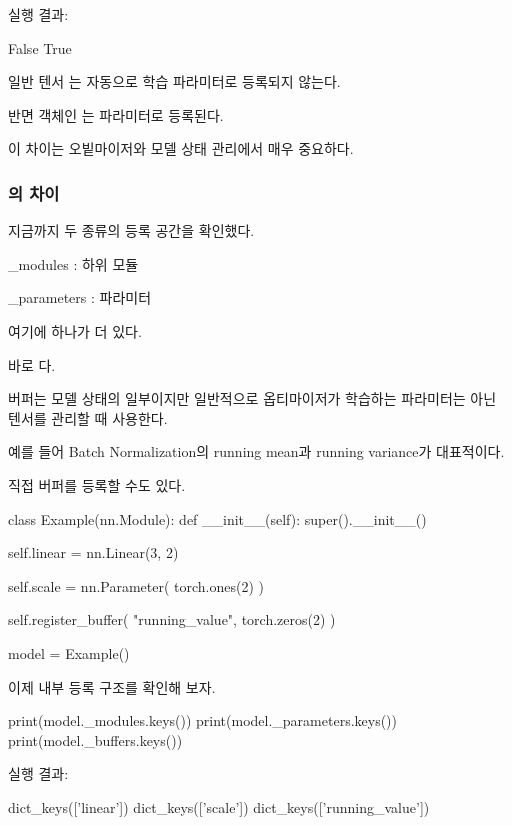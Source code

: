 실행 결과:

\begin{dhkzsh}
False
True
\end{dhkzsh}

일반 텐서 는 자동으로 학습 파라미터로 등록되지 않는다.

반면  객체인 는 파라미터로 등록된다.

이 차이는 오빝마이저와 모델 상태 관리에서 매우 중요하다.

\subsubsection{의 차이}

지금까지 두 종류의 등록 공간을 확인했다.

\begin{dhksmry}
    _modules : 하위 모듈

    _parameters : 파라미터
\end{dhksmry}

여기에 하나가 더 있다.

바로 다.

버퍼는 모델 상태의 일부이지만 일반적으로 옵티마이저가 학습하는 파라미터는 아닌 텐서를 관리할 때 사용한다.

예를 들어 Batch Normalization의 running mean과 running variance가 대표적이다.

직접 버퍼를 등록할 수도 있다.

\begin{dhkcode}
class Example(nn.Module):
    def __init__(self):
        super().__init__()

        self.linear = nn.Linear(3, 2)

        self.scale = nn.Parameter(
            torch.ones(2)
        )

        self.register_buffer(
            "running_value",
            torch.zeros(2)
        )

model = Example()
\end{dhkcode}

이제 내부 등록 구조를 확인해 보자.

\begin{dhkcode}
print(model._modules.keys())
print(model._parameters.keys())
print(model._buffers.keys())
\end{dhkcode}

실행 결과:

\begin{dhkzsh}
dict_keys(['linear'])
dict_keys(['scale'])
dict_keys(['running_value'])
\end{dhkzsh}


